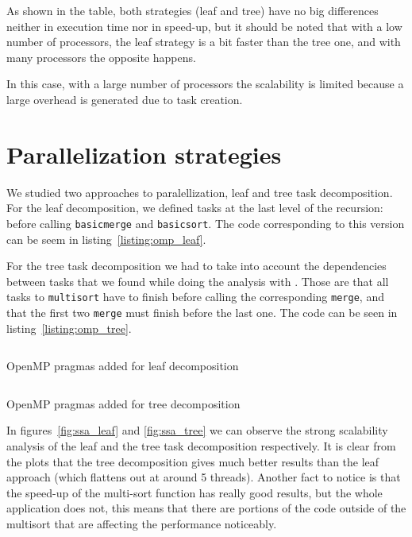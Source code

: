As shown in the table, both strategies (leaf and tree) have no big differences neither in execution time nor in speed-up, but it should be noted that with a low number of processors, the leaf strategy is a bit faster than the tree one, and with many processors the opposite happens.

In this case, with a large number of processors the scalability is limited because a large overhead is generated due to task creation. %

\section{Parallelization strategies}%
\label{sec:par_strats}

We studied two approaches to paralellization, leaf and tree task decomposition. For the leaf decomposition, we
defined tasks at the last level of the recursion: before calling \texttt{basicmerge} and \texttt{basicsort}. The
code corresponding to this version can be seem in listing~\ref{listing:omp_leaf}. 

For the tree task decomposition
we had to take into account the dependencies between tasks that we found while doing the analysis with . Those are that all tasks to \texttt{multisort} have to finish before calling the corresponding
\texttt{merge}, and that the first two \texttt{merge} must finish before the last one. The code can be seen in
listing~\ref{listing:omp_tree}.

\begin{listing}[H]
\inputminted[firstline=32,lastline=63]{c}{sources/multisort-omp-leaf.c}
\caption{OpenMP pragmas added for leaf decomposition}
\label{listing:omp_leaf}
\end{listing}

\begin{listing}[H]
\inputminted[firstline=32,lastline=74]{c}{sources/multisort-omp-tree.c}
\caption{OpenMP pragmas added for tree decomposition}
\label{listing:omp_tree}
\end{listing}

In figures~\ref{fig:ssa_leaf} and \ref{fig:ssa_tree} we can observe the strong scalability analysis
of the leaf and the tree task decomposition respectively. It is clear from the plots that the
tree decomposition gives much better results than the leaf approach (which flattens out at around 5 threads).
Another fact to notice is that the speed-up of the multi-sort function has really good results, but the
whole application does not, this means that there are portions of the code outside of the multisort that are
affecting the performance noticeably.

